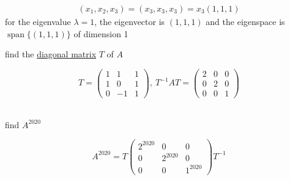 \documentclass[a4paper,12pt]{article}
\DeclareMathOperator{\spn}{span}
\begin{document}
\begin{definition}
\begin{question}
\begin{subquestion}
\begin{answer}
\begin{step}
\begin{gather*}
  (x_1,x_2,x_3) = (x_3,x_3,x_3) = x_3(1,1,1)
\end{gather*}
for the eigenvalue \(\lambda = 1\), the eigenvector is \((1,1,1)\) and the eigenspace is \(\spn\{(1,1,1)\}\) of dimension 1\\
\end{step}
\end{answer}
\end{subquestion}
\begin{subquestion}
find the \hyperref[sec:org136aa39]{diagonal matrix} \(T\) of \(A\)\\
\begin{answer}
\[
  T = \begin{pmatrix} 1 & 1 & 1\\ 1 & 0 & 1\\ 0 & -1 & 1 \end{pmatrix},\ T^{-1}AT = \begin{pmatrix} 2 & 0 & 0\\ 0 & 2 & 0\\ 0 & 0 & 1 \end{pmatrix}
\]\\
\end{answer}
\end{subquestion}

\begin{subquestion}
find \(A^{2020}\)\\
\begin{answer}
\[
  A^{2020} = T\begin{pmatrix} 2^{2020} & 0 & 0\\ 0 & 2^{2020} & 0\\ 0 & 0 & 1^{2020} \end{pmatrix}T^{-1}
\]\\
\end{answer}
\end{subquestion}
\end{question}


\end{definition}
\end{document}
